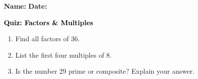 \documentclass[12pt, letterpaper, fleqn]{article}
\begin{document}
\textbf{Name:} \underline{\hspace{5cm}}
\hfill
\textbf{Date:} \underline{\hspace{3cm}}\\

\begin{tcolorbox}[colback=customteal!20]
    \large\textcolor{black}{\textbf{Quiz: Factors \& Multiples}}
\end{tcolorbox}

\vspace{5mm}
\begin{enumerate}[itemsep=3.5cm, leftmargin=0.6cm]
\item Find all factors of 36.
\vspace{3.5cm}

\item List the first four multiples of 8.
\vspace{3.5cm}

\item Is the number 29 prime or composite? Explain your answer.
\end{enumerate}
\end{document}
